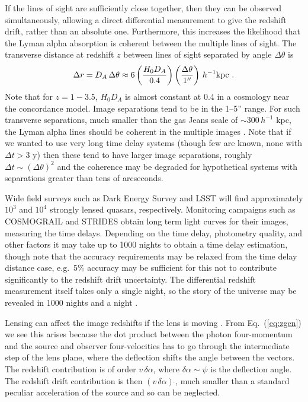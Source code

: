 \documentclass[preprint]{aastex}
\newcommand{\be}{\begin{equation}}
\newcommand{\ee}{\end{equation}}
\begin{document}
If the lines of sight are sufficiently close together, then they can be 
observed simultaneously, allowing a direct differential measurement to give 
the redshift drift, rather than an absolute one.  Furthermore, this increases 
the likelihood that the Lyman alpha absorption is coherent between the 
multiple lines of sight.  The transverse distance at redshift $z$ between 
lines of sight separated by angle $\Delta\theta$ is 
\be 
\Delta r=D_A\,\Delta\theta\approx 
6\left(\frac{H_0D_A}{0.4}\right)\left(\frac{\Delta\theta}{1''}\right)\, 
h^{-1}{\rm kpc} \ . 
\ee 
Note that for $z=1-3.5$, $H_0D_A$ is almost constant at 0.4 in a 
cosmology near the concordance model.  Image separations tend to be in 
the 1--5'' range.  For such transverse separations, much smaller than 
the gas Jeans scale of $\sim300\,h^{-1}$ kpc, the Lyman alpha lines 
should be coherent in the multiple images \cite{09100250}.  
Note that if we wanted to 
use very long time delay systems (though few are known, none with 
$\Delta t>3$ y) then these tend to have larger image separations, roughly 
$\Delta t\sim(\Delta\theta)^2$ and the coherence may be degraded for 
hypothetical systems with separations greater than tens of arcseconds. 

Wide field surveys such as Dark Energy Survey and LSST will find 
approximately $10^3$ and $10^4$ strongly lensed quasars, respectively.  
Monitoring 
campaigns such as COSMOGRAIL \cite{cosmograil} and STRIDES \cite{strides} 
obtain long term light curves for their images, measuring the time 
delays.  Depending on the time delay, photometry quality, and other 
factors it may take up to 1000 nights to obtain a time delay 
estimation, though note that the accuracy requirements may be relaxed 
from the time delay distance case, e.g.\ 5\% accuracy may be sufficient 
for this not to contribute significantly to the redshift drift uncertainty. 
The differential redshift measurement itself takes only a single night, 
so the story of the universe may be revealed in 1000 nights and a night 
\cite{1001}. 

Lensing can affect the image redshifts if the lens is moving 
\cite{mitrofanov,birkgull}.  From 
Eq.~(\ref{eq:zgen}) we see this arises because the dot product between 
the photon four-momentum and the source and observer four-velocities 
has to go through the intermediate step of the lens plane, where the 
deflection shifts the angle between the vectors.  The redshift contribution 
is of order $v\,\delta\alpha$, where $\delta\alpha\sim\psi$ is the 
deflection angle.  The redshift drift contribution is then 
$(v\,\delta\alpha)\,\dot{}$, much smaller than a standard peculiar 
acceleration of the source and so can be neglected. 
\end{document}
